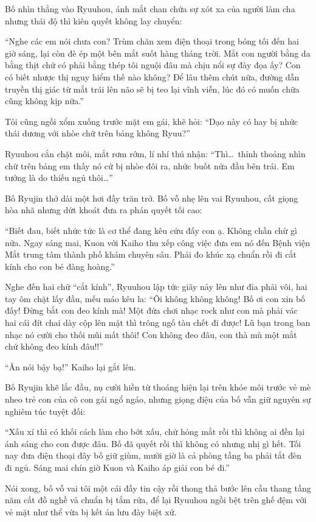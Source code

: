 \documentclass[../main.tex]{subfiles}
\begin{document}
Bố nhìn thẳng vào Ryuuhou, ánh mắt chan chứa sự xót xa của người làm cha nhưng thái độ thì kiên quyết không lay chuyển:

``Nghe các em nói chưa con? Trùm chăn xem điện thoại trong bóng tối đến hai giờ sáng, lại còn đè ép một bên mắt suốt hàng tháng trời. Mắt con người bằng da bằng thịt chứ có phải bằng thép tôi nguội đâu mà chịu nổi sự đày đọa ấy? Con có biết nhược thị nguy hiểm thế nào không? Để lâu thêm chút nữa, đường dẫn truyền thị giác từ mắt trái lên não sẽ bị teo lại vĩnh viễn, lúc đó có muốn chữa cũng không kịp nữa.''

Tôi cũng ngồi xổm xuống trước mặt em gái, khẽ hỏi: ``Dạo này có hay bị nhức thái dương với nhòe chữ trên bảng không Ryuu?''

Ryuuhou cắn chặt môi, mắt rơm rớm, lí nhí thú nhận: ``Thì\dots\ thỉnh thoảng nhìn chữ trên bảng em thấy nó cứ bị nhòe đôi ra, nhức buốt nửa đầu bên trái. Em tưởng là do thiếu ngủ thôi\dots''

Bố Ryujin thở dài một hơi đầy trăn trở. Bố vỗ nhẹ lên vai Ryuuhou, cất giọng hòa nhã nhưng dứt khoát đưa ra phán quyết tối cao:

``Biết đau, biết nhức tức là cơ thể đang kêu cứu đấy con ạ. Không chần chừ gì nữa. Ngay sáng mai, Kuon với Kaiho thu xếp công việc đưa em nó đến Bệnh viện Mắt trung tâm thành phố khám chuyên sâu. Phải đo khúc xạ chuẩn rồi đi cắt kính cho con bé đàng hoàng.''

Nghe đến hai chữ ``cắt kính'', Ryuuhou lập tức giãy nảy lên như đỉa phải vôi, hai tay ôm chặt lấy đầu, mếu máo kêu la: ``Ôi không không không! Bố ơi con xin bố đấy! Đừng bắt con đeo kính mà! Một đứa chơi nhạc rock như con mà phải vác hai cái đít chai dày cộp lên mặt thì trông ngố tàu chết đi được! Lũ bạn trong ban nhạc nó cười cho thối mũi mất thôi! Con không đeo đâu, con thà mù một mắt chứ không đeo kính đâu!!''

``Ăn nói bậy bạ!'' Kaiho lại gắt lên.

Bố Ryujin khẽ lắc đầu, nụ cười hiền từ thoáng hiện lại trên khóe môi trước vẻ mè nheo trẻ con của cô con gái ngổ ngáo, nhưng giọng điệu của bố vẫn giữ nguyên sự nghiêm túc tuyệt đối:

``Xấu xí thì có khối cách làm cho bớt xấu, chứ hỏng mắt rồi thì không ai đền lại ánh sáng cho con được đâu. Bố đã quyết rồi thì không có nhưng nhị gì hết. Tối nay đưa điện thoại đây bố giữ giùm, mười giờ là cả phòng tầng ba phải tắt đèn đi ngủ. Sáng mai chín giờ Kuon và Kaiho áp giải con bé đi.''

Nói xong, bố vỗ vai tôi một cái đầy tin cậy rồi thong thả bước lên cầu thang tầng năm cất đồ nghề và chuẩn bị tắm rửa, để lại Ryuuhou ngồi bệt trên ghế đệm với vẻ mặt như thể vừa bị kết án lưu đày biệt xứ.
\end{document}
